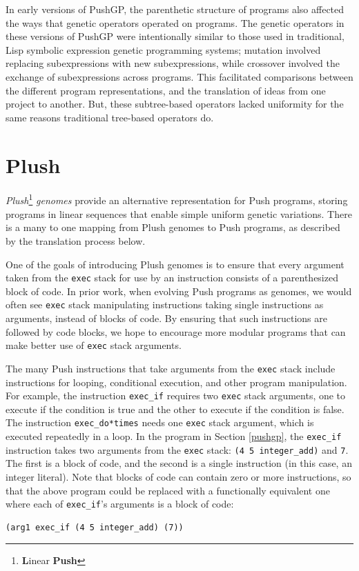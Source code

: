 \documentclass[graybox]{svmult}
\begin{document}
In early versions of PushGP, the parenthetic structure of programs also affected the ways that  genetic
operators operated on programs. The genetic operators in these versions of PushGP were intentionally similar to those used in traditional, Lisp symbolic expression genetic programming systems; mutation involved replacing subexpressions with new subexpressions, while crossover involved the exchange of subexpressions across programs. This facilitated comparisons between the different program representations, and the translation of ideas from one project to another. But, these subtree-based operators lacked uniformity for the same reasons traditional tree-based operators do.


\section{Plush}
\textit{Plush}\footnote{\textbf{L}inear \textbf{Push}} \textit{genomes} provide
an alternative representation for Push programs, storing programs in linear sequences that enable simple uniform genetic variations. There is a many to one mapping from Plush genomes to Push programs, as described by the translation process below.

One of the goals of introducing Plush genomes is to ensure that every argument taken from the \texttt{exec} stack for use by an instruction consists of a parenthesized block of code.
In prior work, when evolving Push programs as genomes, we would often see \texttt{exec} stack manipulating instructions taking single instructions as arguments, instead of blocks of code. By ensuring that such instructions are followed by code blocks, we hope to encourage more modular programs that can make better use of \texttt{exec} stack arguments.

The many Push instructions that take arguments from the \texttt{exec} stack include instructions for looping, conditional execution, and other program manipulation.
For example, the instruction
\texttt{exec\_if} requires two \texttt{exec} stack arguments, one to execute if the condition is true and the other to execute if the condition is false. The instruction \texttt{exec\_do*times} needs one \texttt{exec} stack argument, which is executed repeatedly in a loop.
In the program in Section \ref{pushgp}, the \texttt{exec\_if} instruction takes two arguments from the \texttt{exec} stack: \texttt{(4 5 integer\_add)} and \texttt{7}. The first is a block of code, and the second is a single instruction (in this case, an integer literal).
Note that blocks of code can contain zero or more instructions, so that the above program could be replaced with a functionally equivalent one where each of \texttt{exec\_if}'s arguments is a block of code:
\begin{verbatim}
(arg1 exec_if (4 5 integer_add) (7))
\end{verbatim}
\end{document}
